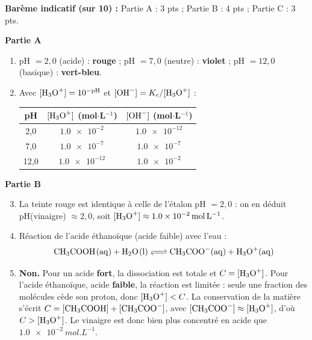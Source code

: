 \documentclass[11pt]{article}
\begin{document}
\begin{corrige}
\textbf{Barème indicatif (sur 10) :} Partie A : 3 pts ; Partie B : 4 pts ; Partie C : 3 pts.

\textbf{Partie A}
\begin{enumerate}
    \item pH $= 2{,}0$ (acide) : \textbf{rouge} ; pH $= 7{,}0$ (neutre) : \textbf{violet} ; pH $= 12{,}0$ (basique) : \textbf{vert-bleu}.
    \item Avec $[\ce{H3O+}] = 10^{-\text{pH}}$ et $[\ce{OH-}] = K_e/[\ce{H3O+}]$ :
    \begin{center}
    \begin{tabular}{|c|c|c|}
    \hline
    \rowcolor{popblueL} \textbf{pH} & \textbf{$[\ce{H3O+}]$ (mol$\cdot$L$^{-1}$)} & \textbf{$[\ce{OH-}]$ (mol$\cdot$L$^{-1}$)} \\
    \hline
    2,0 & $\num{1,0e-2}$ & $\num{1,0e-12}$ \\
    7,0 & $\num{1,0e-7}$ & $\num{1,0e-7}$ \\
    12,0 & $\num{1,0e-12}$ & $\num{1,0e-2}$ \\
    \hline
    \end{tabular}
    \end{center}
\end{enumerate}

\textbf{Partie B}
\begin{enumerate}
    \setcounter{enumi}{2}
    \item La teinte rouge est identique à celle de l'étalon pH $= 2{,}0$ : on en déduit pH(vinaigre) $\approx 2{,}0$, soit $[\ce{H3O+}] \approx \SI{1,0e-2}{mol.L^{-1}}$.
    \item Réaction de l'acide éthanoïque (acide faible) avec l'eau :
    \[ \ce{CH3COOH(aq) + H2O(l) <=> CH3COO-(aq) + H3O+(aq)} \]
    \item \textbf{Non.} Pour un acide \textbf{fort}, la dissociation est totale et $C = [\ce{H3O+}]$. Pour l'acide éthanoïque, acide \textbf{faible}, la réaction est limitée : seule une fraction des molécules cède son proton, donc $[\ce{H3O+}] < C$. La conservation de la matière s'écrit $C = [\ce{CH3COOH}] + [\ce{CH3COO-}]$, avec $[\ce{CH3COO-}] \approx [\ce{H3O+}]$, d'où $C > [\ce{H3O+}]$. Le vinaigre est donc bien plus concentré en acide que $\SI{1,0e-2}{mol.L^{-1}}$.
\end{enumerate}


\end{corrige}
\end{document}
